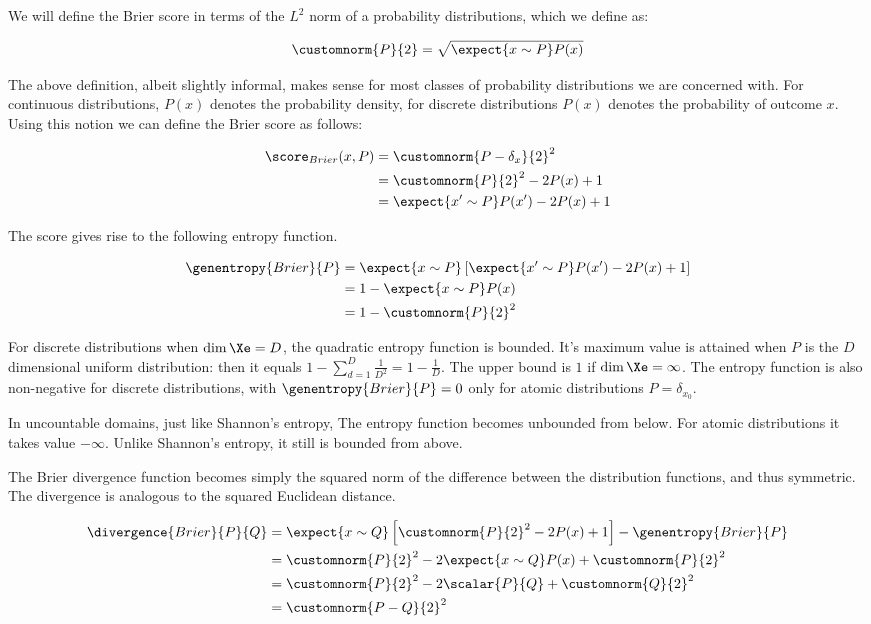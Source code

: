 We will define the Brier score in terms of the $L^2$ norm of a probability distributions, which we define as:

\begin{equation}
	\customnorm{P}{2} = \sqrt{\expect{x \sim P} P(x)}
\end{equation}

The above definition, albeit slightly informal, makes sense for most classes of probability distributions we are concerned with. For continuous distributions, $P(x)$ denotes the probability density, for discrete distributions $P(x)$ denotes the probability of outcome $x$. Using this notion we can define the Brier score as follows:

\begin{align}
	\score_{Brier}(x,P) &= \customnorm{P - \delta_{x}}{2}^2\\
		&= \customnorm{P}{2}^{2} - 2P(x)  + 1\\
		&= \expect{x' \sim P} P(x') - 2P(x) + 1\\
\end{align}

The score gives rise to the following entropy function.

\begin{align}
	\genentropy{Brier}{P} &= \expect{x \sim P}\left[\expect{x' \sim P} P(x') - 2P(x) + 1\right]\\
		&= 1 -\expect{x \sim P} P(x)\\
		&= 1 - \customnorm{P}{2}^2
\end{align}

For discrete distributions when $\dim \Xe = D$, the quadratic entropy function is bounded. It's maximum value is attained when $P$ is the $D$ dimensional uniform distribution: then it equals $1 - \sum_{d=1}^{D}\frac{1}{D^2} = 1 - \frac{1}{D}$. The upper bound is $1$ if $\dim \Xe = \infty$. The entropy function is also non-negative for discrete distributions, with $\genentropy{Brier}{P}=0$ only for atomic distributions $P=\delta_{x_0}$.

In uncountable domains, just like Shannon's entropy, The entropy function becomes unbounded from below. For atomic distributions it takes value $-\infty$. Unlike Shannon's entropy, it still is bounded from above.

The Brier divergence function becomes simply the squared norm of the difference between the distribution functions, and thus symmetric. The divergence is analogous to the squared Euclidean distance.

\begin{align}
	\divergence{Brier}{P}{Q} &= \expect{x \sim Q}\left[\customnorm{P}{2}^2 - 2P(x) + 1\right] - \genentropy{Brier}{P} \\
		&= \customnorm{P}{2}^2 -2 \expect{x \sim Q} P(x) + \customnorm{P}{2}^2 \\
		&= \customnorm{P}{2}^2 - 2\scalar{P}{Q} + \customnorm{Q}{2}^2\\
		&= \customnorm{P-Q}{2}^2
\end{align}

